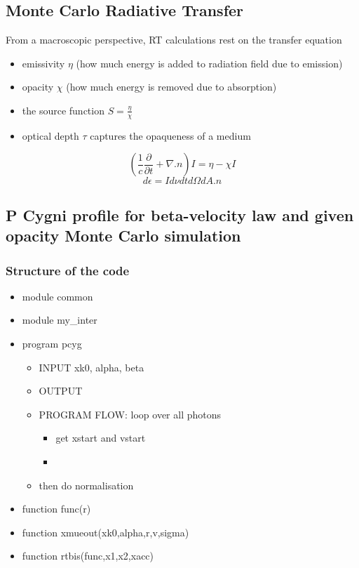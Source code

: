 \documentclass[../main/main.tex]{subfiles}
\begin{document}
\newpage
\subsection{Monte Carlo Radiative Transfer}
From a macroscopic perspective, RT calculations rest on the transfer equation
\begin{itemize}
\item emissivity $\eta$ (how much energy is added to radiation field due to emission)
\item opacity $\chi$ (how much energy is removed due to absorption)
\item the source function $S = \frac{\eta}{\chi}$
\item optical depth $\tau$ captures the opaqueness of a medium
\end{itemize}
\begin{equation}
\left( \frac{1}{c} \frac{\partial}{\partial t} + \nabla.n \right)I = \eta - \chi I
\end{equation}
\begin{equation}
d\epsilon = I d \nu dt d\Omega dA.n
\end{equation}

\newpage
\subsection{P Cygni profile for beta-velocity law and given opacity Monte Carlo simulation}
\subsubsection{Structure of the code}
\begin{itemize}
\item module common

\item module my\_inter

\item program pcyg
\begin{itemize}
\item INPUT xk0, alpha, beta
\item OUTPUT 
\item PROGRAM FLOW: loop over all photons
\begin{itemize}
\item get xstart and vstart
\item 
\end{itemize}
\item then do normalisation
\end{itemize}

\item function func(r)

\item function xmueout(xk0,alpha,r,v,sigma)

\item function rtbis(func,x1,x2,xacc)
\end{itemize}
\end{document}
